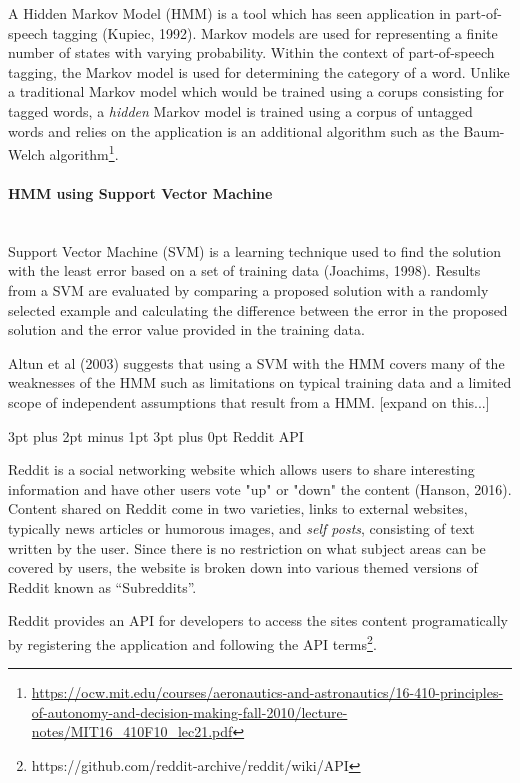 \documentclass[12pt,a4paper]{article}
\makeatletter
\renewcommand\subsection{\@startsection {subsection}{1}{2mm} %
                               {3pt plus 2pt minus 1pt} %
                               {3pt plus 0pt} %
                               {\normalfont\bfseries}}
\makeatother
\begin{document}
A Hidden Markov Model (HMM) is a tool which has seen application in part-of-speech tagging (Kupiec, 1992). Markov models are used for representing a finite number of states with varying probability. Within the context of part-of-speech tagging, the Markov model is used for determining the category of a word. Unlike a traditional Markov model which would be trained using a corups consisting for tagged words, a \emph{hidden} Markov model is trained using a corpus of untagged words and relies on the application is an additional algorithm such as the Baum-Welch algorithm\footnote{\url{https://ocw.mit.edu/courses/aeronautics-and-astronautics/16-410-principles-of-autonomy-and-decision-making-fall-2010/lecture-notes/MIT16_410F10_lec21.pdf}}.

\paragraph{HMM using Support Vector Machine}\mbox{}\\

Support Vector Machine (SVM) is a learning technique used to find the solution with the least error based on a set of training data (Joachims, 1998). Results from a SVM are evaluated by comparing a proposed solution with a randomly selected example and calculating the difference between the error in the proposed solution and the error value provided in the training data.

Altun et al (2003) suggests that using a SVM with the HMM covers many of the weaknesses of the HMM such as limitations on typical training data and a limited scope of independent assumptions that result from a HMM. [expand on this...]

\subsection{Reddit API}

Reddit is a social networking website which allows users to share interesting information and have other users vote "up" or "down" the content (Hanson, 2016). Content shared on Reddit come in two varieties, links to external websites, typically news articles or humorous images, and \emph{self posts}, consisting of text written by the user. Since there is no restriction on what subject areas can be covered by users, the website is broken down into various themed versions of Reddit known as ``Subreddits''.

Reddit provides an API for developers to access the sites content programatically by registering the application and following the API terms\footnote{https://github.com/reddit-archive/reddit/wiki/API}.
\end{document}
